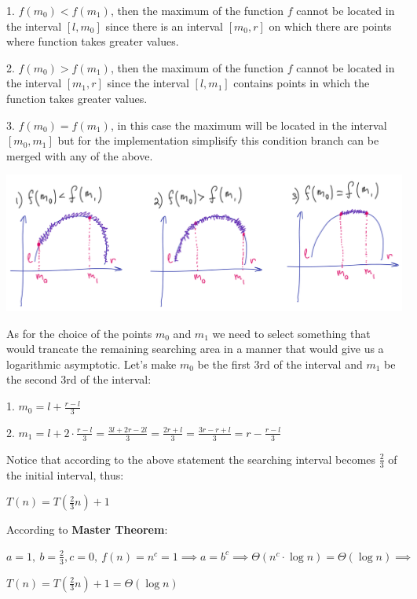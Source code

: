 \begin{definition}
    1. $f(m_0) < f(m_1)$, then the maximum of the function $f$ cannot be located in the interval $[l, m_0]$ since there is an interval $[m_0, r]$ on which there are points where function takes greater values.

    2. $f(m_0) > f(m_1)$, then the maximum of the function $f$ cannot be located in the interval $[m_1, r]$ since the interval $[l, m_1]$ contains points in which the function takes greater values.

    3. $f(m_0) = f(m_1)$, in this case the maximum will be located in the interval $[m_0, m_1]$ but for the implementation simplisify this condition branch can be merged with any of the above.

    \begin{center}
        \includegraphics[scale=0.47]{./assets/09-ternary-search/2.PNG}
    \end{center}

    As for the choice of the points $m_0$ and $m_1$ we need to select something that would trancate the remaining searching area in a manner that would give us a logarithmic asymptotic. Let's make $m_0$ be the first 3rd of the interval and $m_1$ be the second 3rd of the interval:

    1. $m_0 = l + \frac{r - l}{3}$

    2. $m_1 = l + 2 \cdot \frac{r - l}{3} = \frac{3l + 2r -2l}{3} = \frac{2r + l}{3} = \frac{3r - r + l}{3} = r - \frac{r - l}{3}$

    Notice that according to the above statement the searching interval becomes $\frac{2}{3}$ of the initial interval, thus:

    $T(n) = T(\frac{2}{3}n) + 1$

    According to \textbf{Master Theorem}:

    $a = 1, \ b = \frac{2}{3}, c = 0, \ f(n) = n^c = 1 \implies a = b^c \implies \Theta(n^c \cdot \log{n}) = \Theta(\log{n}) \implies$

    $T(n) = T(\frac{2}{3}n) + 1 = \Theta(\log{n})$

\end{definition}



